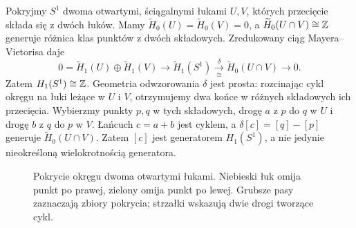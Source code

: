 \begin{przyklad}
\label{prz:mv-okrag}
Pokryjmy $S^1$ dwoma otwartymi,
ściągalnymi łukami $U,V$, których
przecięcie składa się z dwóch
łuków. Mamy
$\widetilde H_0(U)=
\widetilde H_0(V)=0$,
a $\widetilde H_0(U\cap V)\cong\mathbb{Z}$
generuje różnica klas punktów
z dwóch składowych.
Zredukowany ciąg
Mayera--Vietorisa daje
\[
 0=\widetilde H_1(U)\oplus
 \widetilde H_1(V)\to
 \widetilde H_1(S^1)
 \xrightarrow[\cong]{\delta}
 \widetilde H_0(U\cap V)\to0.
\]
Zatem $H_1(S^1)\cong\mathbb{Z}$.
Geometria odwzorowania $\delta$ jest prosta:
rozcinając cykl okręgu na łuki
leżące w $U$ i $V$, otrzymujemy
dwa końce w różnych składowych
ich przecięcia.
Wybierzmy punkty $p,q$ w tych składowych, drogę $a$ z $p$ do $q$
w $U$ i drogę $b$ z $q$ do $p$ w $V$.
Łańcuch $c=a+b$ jest cyklem, a
$\delta[c]=[q]-[p]$ generuje $\widetilde H_0(U\cap V)$.
Zatem $[c]$ jest generatorem $H_1(S^1)$, a nie jedynie
nieokreśloną wielokrotnością generatora.
\end{przyklad}

\begin{figure}[!htbp]
\centering
{}
\caption{Pokrycie okręgu dwoma otwartymi łukami. Niebieski łuk
omija punkt po prawej, zielony omija punkt po lewej.
Grubsze pasy zaznaczają zbiory pokrycia; strzałki wskazują
dwie drogi tworzące cykl.}
\label{fig:mv-okrag-8}
\end{figure}

